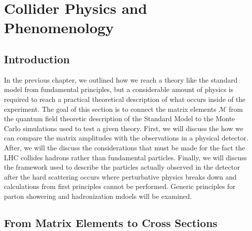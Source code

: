 \chapter{Collider Physics and Phenomenology}

\section{Introduction}

In the previous chapter, we outlined how we reach a theory like the standard model from fundamental principles, but 
a considerable amount of physics is required to reach a practical theoretical description of what occurs inside of 
the experiment. The goal of this section is to connect the matrix elements $\mathcal{M}$ from the quantum field
theoretic description  of the Standard Model to the Monte Carlo simulations used to test a given theory. 
First, we will discuss the how
we can compare the matrix amplitudes with the observations in a physical detector. After, we will the discuss the considerations 
that must be made for the fact the LHC collides hadrons rather than fundamental particles. Finally, we will discuss the framework used to describe the particles actually observed in the detector after the hard scattering occurs where perturbative physics breaks down and  calculations from first principles cannot be performed. Generic principles for parton showering and hadronization mdoels will be examined. 

\section{From Matrix Elements to Cross Sections} 


